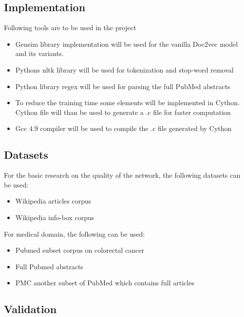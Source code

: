 \documentclass[12pt,a4paper] {article}
\begin{document}
\subsection*{Implementation}
Following tools are to be used in the project

\begin{itemize}
	\item Gensim library \cite{rehurek_lrec} implementation will be used for the vanilla Doc2vec model and its variants. 
	
	\item Pythons nltk library will be used for tokenization and stop-word removal
	
	\item Python library regex will be used for parsing the full PubMed abstracts 
	
	\item To reduce the training time some elements will be implemented in Cython. Cython file will than be used to generate a .c file for faster computation
	
	\item Gcc 4.9 compiler will be used to compile the .c file generated by Cython 
	
	
\end{itemize}


\subsection*{Datasets}
For the basic research on the quality of the network, the following datasets can 
be used:
\begin{itemize}
	\item Wikipedia articles corpus
	\item Wikipedia info-box corpus
\end{itemize}

For medical domain, the following can be used:
\begin{itemize}
	\item Pubmed subset corpus on colorectal cancer
	\item Full Pubmed abstracts
	\item PMC another subset of PubMed which contains full articles
\end{itemize}


\subsection*{Validation}
\end{document}
